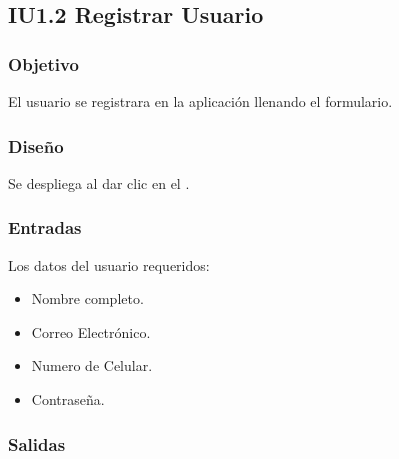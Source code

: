 \newpage
\subsection{IU1.2 Registrar Usuario}

\subsubsection{Objetivo}
	El usuario se  registrara en la aplicación llenando el formulario.

\subsubsection{Diseño}
	Se despliega al dar clic en el .


\subsubsection{Entradas}
Los datos del usuario requeridos:
\begin{itemize}
	\item Nombre completo.
	\item Correo Electrónico.
	\item Numero de Celular.
	\item Contraseña.
\end{itemize}

\subsubsection{Salidas}
\begin{Citemize}
	\item {}
	\item {}
	\item {}
	\item {}
	\item {}
	\item {}
	\item {}
	\item {}
\end{Citemize}
